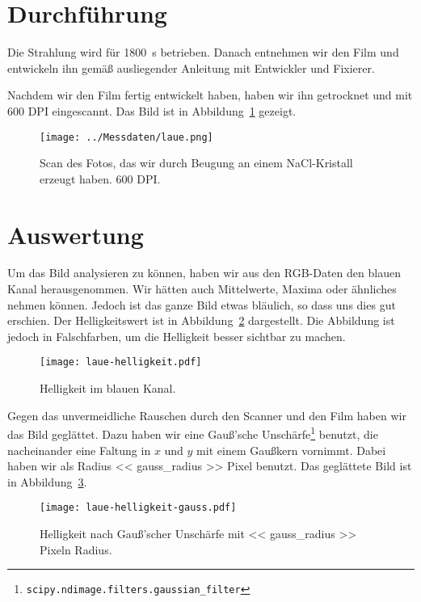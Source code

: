 \section{Durchführung}

Die Strahlung wird für \SI{1800}{\second} betrieben. Danach entnehmen wir den
Film und entwickeln ihn gemäß ausliegender Anleitung mit Entwickler und
Fixierer.

Nachdem wir den Film fertig entwickelt haben, haben wir ihn getrocknet und mit
600 DPI eingescannt. Das Bild ist in Abbildung~\ref{fig:laue} gezeigt.

\begin{figure}[htbp]
    \centering
    \texttt{[image: ../Messdaten/laue.png]}
    \caption{%
        Scan des Fotos, das wir durch Beugung an einem NaCl-Kristall erzeugt
        haben. 600 DPI.
    }
    \label{fig:laue}
\end{figure}

\section{Auswertung}

Um das Bild analysieren zu können, haben wir aus den RGB-Daten den blauen Kanal
herausgenommen. Wir hätten auch Mittelwerte, Maxima oder ähnliches nehmen
können. Jedoch ist das ganze Bild etwas bläulich, so dass uns dies gut
erschien. Der Helligkeitswert ist in Abbildung~\ref{fig:laue-helligkeit}
dargestellt. Die Abbildung ist jedoch in Falschfarben, um die Helligkeit besser
sichtbar zu machen.

\begin{figure}[htbp]
    \centering
    \texttt{[image: laue-helligkeit.pdf]}
    \caption{%
        Helligkeit im blauen Kanal.
    }
    \label{fig:laue-helligkeit}
\end{figure}

Gegen das unvermeidliche Rauschen durch den Scanner und den Film haben wir das
Bild geglättet. Dazu haben wir eine Gauß'sche
Unschärfe\footnote{\texttt{scipy.ndimage.filters.gaussian\_filter}} benutzt, die
nacheinander eine Faltung in  $x$ und $y$ mit einem Gaußkern vornimmt. Dabei
haben wir als Radius << gauss_radius >> Pixel benutzt. Das geglättete Bild ist
in Abbildung~\ref{fig:laue-gauss}.

\begin{figure}[htbp]
    \centering
    \texttt{[image: laue-helligkeit-gauss.pdf]}
    \caption{%
        Helligkeit nach Gauß'scher Unschärfe mit << gauss_radius >> Pixeln
        Radius.
    }
    \label{fig:laue-gauss}
\end{figure}

